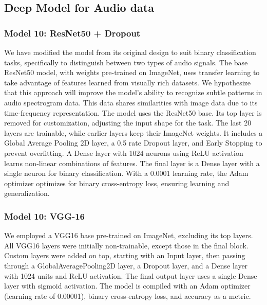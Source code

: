 \documentclass[12pt]{article}
\begin{document}
\subsection{Deep Model for Audio data}
\subsubsection{Model 10: ResNet50 + Dropout}
We have modified the model from its original design to suit binary classification tasks, specifically to distinguish between two types of audio signals. The base ResNet50 model, with weights pre-trained on ImageNet, uses transfer learning to take advantage of features learned from visually rich datasets. We hypothesize that this approach will improve the model's ability to recognize subtle patterns in audio spectrogram data. This data shares similarities with image data due to its time-frequency representation. The model uses the ResNet50 base. Its top layer is removed for customization, adjusting the input shape for the task. The last 20 layers are trainable, while earlier layers keep their ImageNet weights. It includes a Global Average Pooling 2D layer, a 0.5 rate Dropout layer, and Early Stopping to prevent overfitting. A Dense layer with 1024 neurons using ReLU activation learns non-linear combinations of features. The final layer is a Dense layer with a single neuron for binary classification. With a 0.0001 learning rate, the Adam optimizer optimizes for binary cross-entropy loss, ensuring learning and generalization.
\subsubsection{Model 10: VGG-16}
We employed a VGG16 base pre-trained on ImageNet, excluding its top layers. All VGG16 layers were initially non-trainable, except those in the final block. Custom layers were added on top, starting with an Input layer, then passing through a GlobalAveragePooling2D layer, a Dropout layer, and a Dense layer with 1024 units and ReLU activation. The final output layer uses a single Dense layer with sigmoid activation. The model is compiled with an Adam optimizer (learning rate of 0.00001), binary cross-entropy loss, and accuracy as a metric.
\end{document}
